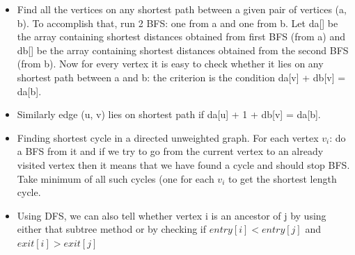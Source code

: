 \documentclass[8pt, a4paper, oneside, twocolumn]{extarticle}
\begin{document}
\begin{itemize}
    \item Find all the vertices on any shortest path between a given pair of vertices (a, b). To accomplish that, run 2 BFS: one from a and one from b. Let da[] be the array containing shortest distances obtained from first BFS (from a) and db[] be the array containing shortest distances obtained from the second BFS (from b). Now for every vertex it is easy to check whether it lies on any shortest path between a and b: the criterion is the condition da[v] + db[v] = da[b].
    \item Similarly edge (u, v) lies on shortest path if da[u] + 1 + db[v] = da[b].
    \item Finding shortest cycle in a directed unweighted graph. For each vertex $v_i$: do a BFS from it and if we try to go from the current vertex to an already visited vertex then it means that we have found a cycle and should stop BFS.
    \\Take minimum of all such cycles (one for each $v_i$ to get the shortest length cycle.
    \item Using DFS, we can also tell whether vertex i is an ancestor of j by using either that subtree method or by checking if $entry[i] < entry[j]$ and $exit[i] > exit[j]$
\end{itemize}
\end{document}
